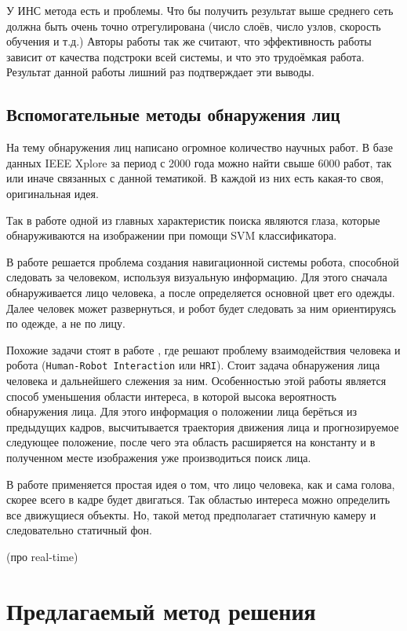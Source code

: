 \documentclass[12pt]{report}
\begin{document}
 У ИНС метода есть и проблемы. Что бы получить результат выше среднего сеть должна быть очень точно отрегулирована (число слоёв, число узлов, скорость обучения и т.д.) \citep{jee2004eye} Авторы работы \citep{capi2010vision} так же считают, что эффективность работы зависит от качества подстроки всей системы, и что это трудоёмкая работа. Результат данной работы лишний раз подтверждает эти выводы.

\section{Вспомогательные методы обнаружения лиц}

На тему обнаружения лиц написано огромное количество научных работ. В базе данных IEEE Xplore за период с 2000 года можно найти свыше 6000 работ, так или иначе связанных с данной тематикой. В каждой из них есть какая-то своя, оригинальная идея.

Так в работе \citep{jee2004eye} одной из главных характеристик поиска являются глаза, которые обнаруживаются на изображении при помощи SVM классификатора.

В работе \citep{capi2010vision} решается проблема создания навигационной системы робота, способной следовать за человеком, используя визуальную информацию. Для этого сначала обнаруживается лицо человека, а после определяется основной цвет его одежды. Далее человек может развернуться, и робот будет следовать за ним ориентируясь по одежде, а не по лицу.

Похожие задачи стоят в работе \citep{luo2007face}, где решают проблему взаимодействия человека и робота (\texttt{Human-Robot Interaction} или \texttt{HRI}). Стоит задача обнаружения лица человека и дальнейшего слежения за ним. Особенностью этой работы является способ уменьшения области интереса, в которой высока вероятность обнаружения лица. Для этого информация о положении лица берёться из предыдущих кадров, высчитывается траектория движения лица и прогнозируемое следующее положение, после чего эта область расширяется на константу и в полученном месте изображения уже производиться поиск лица.

В работе \citep{zhang2010fast} применяется простая идея о том, что лицо человека, как и сама голова, скорее всего в кадре будет двигаться. Так областью интереса можно определить все движущиеся объекты. Но, такой метод предполагает статичную камеру и следовательно статичный фон.

(про real-time)

\chapter{Предлагаемый метод решения}
\thispagestyle{fancy}
\end{document}
